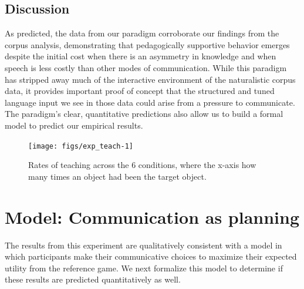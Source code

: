 \documentclass[10pt, letterpaper]{article}
\newenvironment{CodeChunk}{}{}
\begin{document}
\subsection{Discussion}\label{discussion-1}

As predicted, the data from our paradigm corroborate our findings from
the corpus analysis, demonstrating that pedagogically supportive
behavior emerges despite the initial cost when there is an asymmetry in
knowledge and when speech is less costly than other modes of
communication. While this paradigm has stripped away much of the
interactive environment of the naturalistic corpus data, it provides
important proof of concept that the structured and tuned language input
we see in those data could arise from a pressure to communicate. The
paradigm's clear, quantitative predictions also allow us to build a
formal model to predict our empirical results.

\begin{CodeChunk}
\begin{figure}[tb]
\texttt{[image: figs/exp\_teach-1]} \caption[Rates of teaching across the 6 conditions, where the x-axis how many times an object had been the target object]{Rates of teaching across the 6 conditions, where the x-axis how many times an object had been the target object.}\label{fig:exp_teach}
\end{figure}
\end{CodeChunk}

\section{Model: Communication as
planning}\label{model-communication-as-planning}

The results from this experiment are qualitatively consistent with a
model in which participants make their communicative choices to maximize
their expected utility from the reference game. We next formalize this
model to determine if these results are predicted quantitatively as
well.

\newcommand{\E}[1]{\mathbb{E}\left[ #1 \right]}
\end{document}
